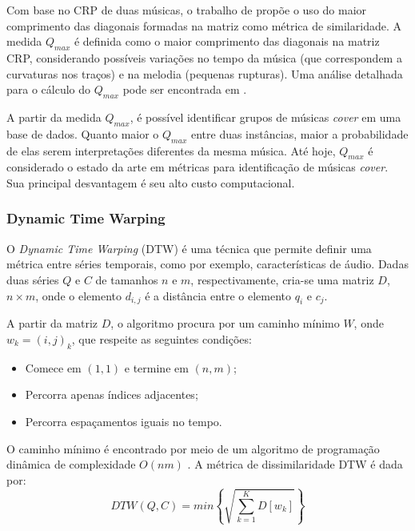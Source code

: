 Com base no CRP de duas músicas, o trabalho de  propõe o uso do maior comprimento das diagonais formadas na matriz como métrica de similaridade. A medida \({Q_{max}}\) é definida como o maior comprimento das diagonais na matriz CRP, considerando possíveis variações no tempo da música (que correspondem a curvaturas nos traços) e na melodia (pequenas rupturas). Uma análise detalhada para o cálculo do \({Q_{max}}\) pode ser encontrada em \cite{serra2009}.

A partir da medida \({Q_{max}}\), é possível identificar grupos de músicas \textit{cover} em uma base de dados. Quanto maior o \({Q_{max}}\) entre duas instâncias, maior a probabilidade de elas serem interpretações diferentes da mesma música. Até hoje, \({Q_{max}}\) é considerado o estado da arte em métricas para identificação de músicas \textit{cover}. Sua principal desvantagem é seu alto custo computacional.

\subsubsection{Dynamic Time Warping} \label{subsubsec:dtw}
O \textit{Dynamic Time Warping} (DTW) \cite{keogh2004} é uma técnica que permite definir uma métrica entre séries temporais, como por exemplo, características de áudio. Dadas duas séries \({Q}\) e \({C}\) de tamanhos \({n}\) e \({m}\), respectivamente, cria-se uma matriz \({D}\), \({n\times m}\), onde o elemento \({d_{i,j}}\) é a distância entre o elemento \({q_{i}}\) e \({c_{j}}\).

A partir da matriz \({D}\), o algoritmo procura por um caminho mínimo \({W}\), onde \({w_{k} = (i,j)_{k}}\), que respeite as seguintes condições:

\begin{itemize}
    \item Comece em \({(1,1)}\) e termine em \({(n,m)}\);
    \item Percorra apenas índices adjacentes;
    \item Percorra espaçamentos iguais no tempo.
\end{itemize}

O caminho mínimo é encontrado por meio de um algoritmo de programação dinâmica de complexidade \({O(nm)}\) \cite{keogh2004}. A métrica de dissimilaridade DTW é dada por:
\begin{equation}
    DTW(Q,C) = min\left\{\sqrt{\sum_{k=1}^{K} D[w_{k}]}\right\}
\end{equation}

